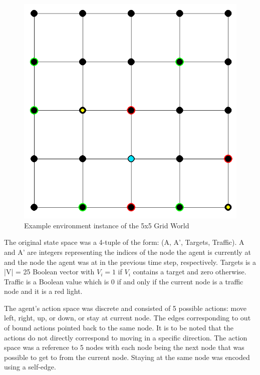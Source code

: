 \documentclass{article}
\begin{document}
	\begin{figure}[hbt!]
		\label{grid_world}
		\centering
		\includegraphics[scale=0.5]{grid-world.png}
		\caption{Example environment instance of the 5x5 Grid World}
		\label{fig:grid-world.png}
	\end{figure}
	\FloatBarrier 
	
	The original state space was a 4-tuple of the form: (A, A', Targets, Traffic). A and A' are integers representing the indices of the node the agent is currently at and the node the agent was at in the previous time step, respectively. Targets is a |V| = 25 Boolean vector with $V_{i}=1$ if $V_i$ contains a target and zero otherwise. Traffic is a Boolean value which is 0 if and only if the current node is a traffic node and it is a red light.
	
	The agent's action space was discrete and consisted of 5 possible actions: move left, right, up, or down, or stay at current node. The edges corresponding to out of bound actions pointed back to the same node. It is to be noted that the actions do not directly correspond to moving in a specific direction. The action space was a reference to 5 nodes with each node being the next node that was possible to get to from the current node. Staying at the same node was encoded using a self-edge.
	
\end{document}
